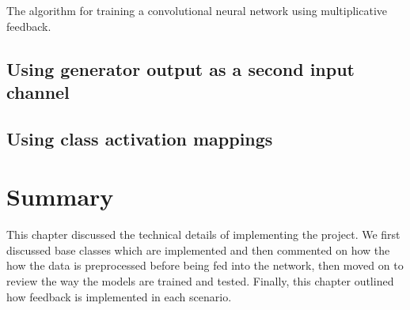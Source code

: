\documentclass{l4proj}
\begin{document}
\begin{algorithm}
    \DontPrintSemicolon
    
\caption{The algorithm for training a convolutional neural network using multiplicative feedback. }\label{alg:multiplicative}
\end{algorithm}


\subsection{Using generator output as a second input channel}
\subsection{Using class activation mappings}

\section{Summary}
This chapter discussed the technical details of implementing the project. We first discussed base classes which are implemented and then commented on how the how the data is preprocessed before being fed into the network, then moved on to review the way the models are trained and tested. Finally, this chapter outlined how feedback is implemented in each scenario. 

\end{document}
